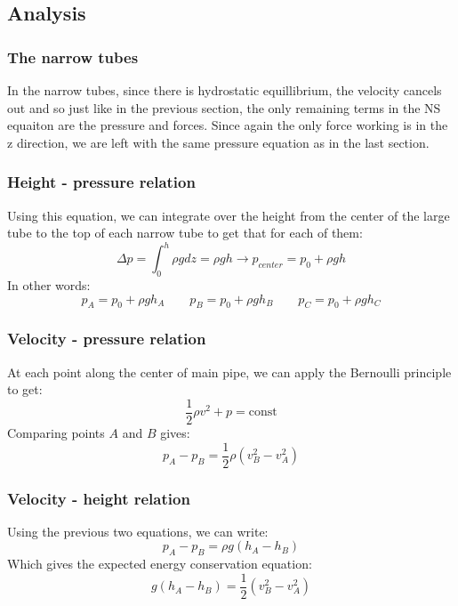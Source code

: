 \documentclass{article}
\begin{document}
\subsection{Analysis}
\subsubsection{The narrow tubes}
In the narrow tubes, since there is hydrostatic equillibrium, the velocity cancels out and so just like in the previous section, the only remaining terms in the NS equaiton are the pressure and forces. Since again the only force working is in the z direction, we are left with the same pressure equation as in the last section.
\subsubsection{Height - pressure relation}
Using this equation, we can integrate over the height from the center of the large tube to the top of each narrow tube to get that for each of them:
\begin{equation}
    \Delta p = \int_0^{h} \rho g dz = \rho g h \rightarrow p_{center} = p_0 + \rho g h
\end{equation}
In other words:
\begin{equation}
    \boxed{
        p_A = p_0 + \rho g h_A
        \qquad
        p_B = p_0 + \rho g h_B
        \qquad
        p_C = p_0 + \rho g h_C
    }
\end{equation}
\subsubsection{Velocity - pressure relation}
At each point along the center of main pipe, we can apply the Bernoulli principle to get:
\begin{equation}
    \frac{1}{2}\rho v^2 + p = \text{const}
\end{equation}
Comparing points $A$ and $B$ gives:
\begin{equation}
    \boxed{p_A - p_B = \frac{1}{2}\rho\left(v_B^2 - v_A^2\right)}
\end{equation}
\subsubsection{Velocity - height relation}
Using the previous two equations, we can write:
\begin{equation}
    p_A - p_B = \rho g \left(h_A - h_B\right)
\end{equation}
Which gives the expected energy conservation equation:
\begin{equation}
    \boxed{g \left(h_A - h_B\right) = \frac{1}{2}\left(v_B^2 - v_A^2\right)}
\end{equation}
\end{document}
